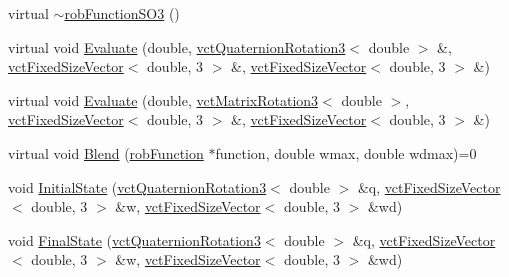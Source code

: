 \begin{DoxyCompactItemize}
\item 
virtual \hyperlink{classrob_function_s_o3_ac3dfa61cd91175c48c11f49c0d03f6ac}{$\sim$rob\+Function\+S\+O3} ()
\item 
virtual void \hyperlink{classrob_function_s_o3_a1c7d71ed0dbd9fb669af528372dd49ca}{Evaluate} (double, \hyperlink{classvct_quaternion_rotation3}{vct\+Quaternion\+Rotation3}$<$ double $>$ \&, \hyperlink{classvct_fixed_size_vector}{vct\+Fixed\+Size\+Vector}$<$ double, 3 $>$ \&, \hyperlink{classvct_fixed_size_vector}{vct\+Fixed\+Size\+Vector}$<$ double, 3 $>$ \&)
\item 
virtual void \hyperlink{classrob_function_s_o3_af618229526d1430e0b27556499336fb0}{Evaluate} (double, \hyperlink{classvct_matrix_rotation3}{vct\+Matrix\+Rotation3}$<$ double $>$, \hyperlink{classvct_fixed_size_vector}{vct\+Fixed\+Size\+Vector}$<$ double, 3 $>$ \&, \hyperlink{classvct_fixed_size_vector}{vct\+Fixed\+Size\+Vector}$<$ double, 3 $>$ \&)
\item 
virtual void \hyperlink{classrob_function_s_o3_a490d756026b0030048f084baf97ee34b}{Blend} (\hyperlink{classrob_function}{rob\+Function} $\ast$function, double wmax, double wdmax)=0
\item 
void \hyperlink{classrob_function_s_o3_a702e17e3369caeded7947142dbf8d763}{Initial\+State} (\hyperlink{classvct_quaternion_rotation3}{vct\+Quaternion\+Rotation3}$<$ double $>$ \&q, \hyperlink{classvct_fixed_size_vector}{vct\+Fixed\+Size\+Vector}$<$ double, 3 $>$ \&w, \hyperlink{classvct_fixed_size_vector}{vct\+Fixed\+Size\+Vector}$<$ double, 3 $>$ \&wd)
\item 
void \hyperlink{classrob_function_s_o3_a5c81753e7ae451aadd29201e1608e395}{Final\+State} (\hyperlink{classvct_quaternion_rotation3}{vct\+Quaternion\+Rotation3}$<$ double $>$ \&q, \hyperlink{classvct_fixed_size_vector}{vct\+Fixed\+Size\+Vector}$<$ double, 3 $>$ \&w, \hyperlink{classvct_fixed_size_vector}{vct\+Fixed\+Size\+Vector}$<$ double, 3 $>$ \&wd)
\end{DoxyCompactItemize}
